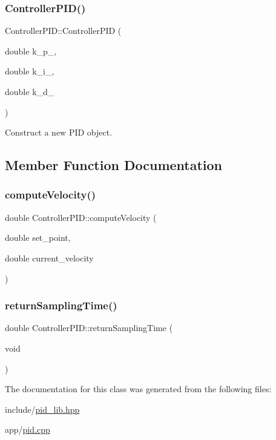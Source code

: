 \subsubsection{\texorpdfstring{Controller\+P\+I\+D()}{ControllerPID()}}
{\footnotesize\ttfamily Controller\+P\+I\+D\+::\+Controller\+P\+ID (\begin{DoxyParamCaption}\item[{double}]{k\+\_\+p\+\_\+,  }\item[{double}]{k\+\_\+i\+\_\+,  }\item[{double}]{k\+\_\+d\+\_\+ }\end{DoxyParamCaption})\hspace{0.3cm}{\ttfamily [inline]}}



Construct a new P\+ID object. 



\subsection{Member Function Documentation}
\mbox{\label{class_controller_p_i_d_a65bb68a133b87f5b4bd78c22c48c8b68}} 
\subsubsection{\texorpdfstring{compute\+Velocity()}{computeVelocity()}}
{\footnotesize\ttfamily double Controller\+P\+I\+D\+::compute\+Velocity (\begin{DoxyParamCaption}\item[{double}]{set\+\_\+point,  }\item[{double}]{current\+\_\+velocity }\end{DoxyParamCaption})}

\mbox{\label{class_controller_p_i_d_ab787e05af656c81fdc02fa4311a4cc7d}} 
\subsubsection{\texorpdfstring{return\+Sampling\+Time()}{returnSamplingTime()}}
{\footnotesize\ttfamily double Controller\+P\+I\+D\+::return\+Sampling\+Time (\begin{DoxyParamCaption}\item[{void}]{ }\end{DoxyParamCaption})}



The documentation for this class was generated from the following files\+:\begin{DoxyCompactItemize}
\item 
include/\hyperlink{pid__lib_8hpp}{pid\+\_\+lib.\+hpp}\item 
app/\hyperlink{pid_8cpp}{pid.\+cpp}\end{DoxyCompactItemize}
